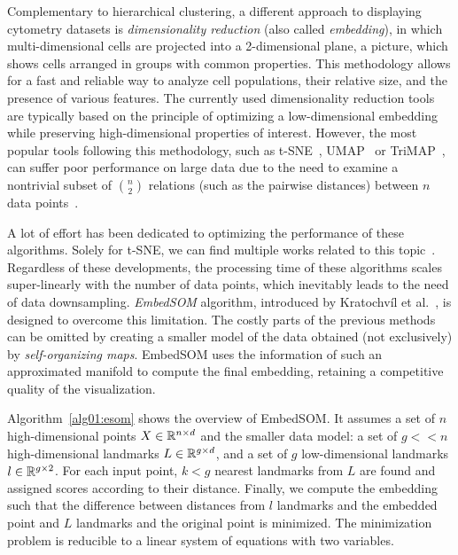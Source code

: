 Complementary to hierarchical clustering, a different approach to displaying cytometry datasets is \emph{dimensionality reduction} (also called \emph{embedding}), in which multi-dimensional cells are projected into a 2-dimensional plane, a picture, which shows cells arranged in groups with common properties. This methodology allows for a fast and reliable way to analyze cell populations, their relative size, and the presence of various features. The currently used dimensionality reduction tools are typically based on the principle of optimizing a low-dimensional embedding while preserving high-dimensional properties of interest. However, the most popular tools following this methodology, such as t-SNE~\cite{maaten2008visualizing}, UMAP~\cite{becht2019dimensionality} or TriMAP~\cite{amid2019trimap}, can suffer poor performance on large data due to the need to examine a nontrivial subset of $\binom{n}{2}$ relations (such as the pairwise distances) between $n$ data points~\cite{kratochvil2019generalized}.

A lot of effort has been dedicated to optimizing the performance of these algorithms. Solely for t-SNE, we can find multiple works related to this topic~\cite{pezzotti2016hierarchical,pezzotti2016approximated,linderman2017efficient,belkina2018automated}. Regardless of these developments, the processing time of these algorithms scales super-linearly with the number of data points, which inevitably leads to the need of data downsampling. \emph{EmbedSOM} algorithm, introduced by Kratochvíl et al.~\cite{kratochvil2019generalized}, is designed to overcome this limitation. The costly parts of the previous methods can be omitted by creating a smaller model of the data obtained (not exclusively) by \emph{self-organizing maps}. EmbedSOM uses the information of such an approximated manifold to compute the final embedding, retaining a competitive quality of the visualization.

Algorithm~\ref{alg01:esom} shows the overview of EmbedSOM. It assumes a set of $n$ high-dimensional points $X \in \mathbb{R}^{n \times d}$ and the smaller data model: a set of $g << n$ high-dimensional landmarks $L \in \mathbb{R}^{g \times d}$, and a set of $g$ low-dimensional landmarks $l \in \mathbb{R}^{g \times 2}$. For each input point, $k < g$ nearest landmarks from $L$ are found and assigned scores according to their distance. Finally, we compute the embedding such that the difference between distances from $l$ landmarks and the embedded point and $L$ landmarks and the original point is minimized. The minimization problem is reducible to a linear system of equations with two variables.


